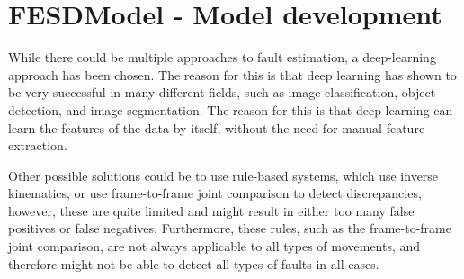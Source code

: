 \chapter[FESDModel]{FESDModel - Model development}
\label{sec:model_development}

While there could be multiple approaches to fault estimation, a deep-learning approach has been chosen. The reason for this is that deep learning has shown to be very successful in many different fields, such as image classification, object detection, and image segmentation. The reason for this is that deep learning can learn the features of the data by itself, without the need for manual feature extraction.

Other possible solutions could be to use rule-based systems, which use inverse kinematics, or use frame-to-frame joint comparison to detect discrepancies, however, these are quite limited and might result in either too many false positives or false negatives. Furthermore, these rules, such as the frame-to-frame joint comparison, are not always applicable to all types of movements, and therefore might not be able to detect all types of faults in all cases.



